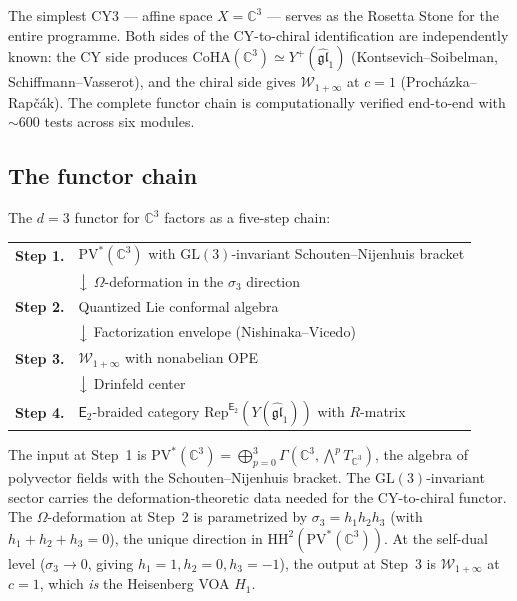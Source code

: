 \documentclass[11pt]{article}
\newcommand{\cW}{\mathcal{W}}
\newcommand{\fgl}{\mathfrak{gl}}
\newcommand{\C}{\mathbb{C}}
\newcommand{\Etwo}{\mathsf{E}_2}
\newcommand{\HH}{\mathrm{HH}}
\newcommand{\CoHA}{\mathrm{CoHA}}
\newcommand{\Rep}{\mathrm{Rep}}
\begin{document}
The simplest CY3 --- affine space $X = \C^3$ --- serves as the Rosetta Stone for the entire programme. Both sides of the CY-to-chiral identification are independently known: the CY side produces $\CoHA(\C^3) \simeq Y^+(\widehat{\fgl}_1)$ (Kontsevich--Soibelman, Schiffmann--Vasserot), and the chiral side gives $\cW_{1+\infty}$ at $c = 1$ (Proch\'azka--Rap\v{c}\'ak). The complete functor chain is computationally verified end-to-end with $\sim 600$ tests across six modules.

\subsection{The functor chain}
\label{subsec:c3-functor-chain}

The $d = 3$ functor for $\C^3$ factors as a five-step chain:

\begin{center}
\renewcommand{\arraystretch}{1.3}
\begin{tabular}{rl}
\textbf{Step 1.} & $\mathrm{PV}^*(\C^3)$ with $\mathrm{GL}(3)$-invariant Schouten--Nijenhuis bracket \\[3pt]
& $\big\downarrow$ \quad $\Omega$-deformation in the $\sigma_3$ direction \\[3pt]
\textbf{Step 2.} & Quantized Lie conformal algebra \\[3pt]
& $\big\downarrow$ \quad Factorization envelope (Nishinaka--Vicedo) \\[3pt]
\textbf{Step 3.} & $\cW_{1+\infty}$ with nonabelian OPE \\[3pt]
& $\big\downarrow$ \quad Drinfeld center \\[3pt]
\textbf{Step 4.} & $\Etwo$-braided category $\Rep^{\Etwo}(Y(\widehat{\fgl}_1))$ with $R$-matrix \\
\end{tabular}
\end{center}

The input at Step~1 is $\mathrm{PV}^*(\C^3) = \bigoplus_{p=0}^{3} \Gamma(\C^3, \bigwedge^p T_{\C^3})$, the algebra of polyvector fields with the Schouten--Nijenhuis bracket. The $\mathrm{GL}(3)$-invariant sector carries the deformation-theoretic data needed for the CY-to-chiral functor. The $\Omega$-deformation at Step~2 is parametrized by $\sigma_3 = h_1 h_2 h_3$ (with $h_1 + h_2 + h_3 = 0$), the unique direction in $\HH^2(\mathrm{PV}^*(\C^3))$. At the self-dual level ($\sigma_3 \to 0$, giving $h_1 = 1, h_2 = 0, h_3 = -1$), the output at Step~3 is $\cW_{1+\infty}$ at $c = 1$, which \emph{is} the Heisenberg VOA $H_1$.
\end{document}
